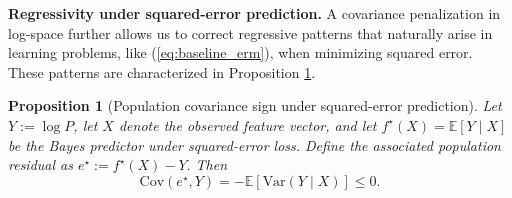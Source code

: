 \documentclass[12pt, draft]{article}
\theoremstyle{plain}
\newtheorem{proposition}{Proposition}
\theoremstyle{definition}
\newcommand{\E}{\mathbb{E}}
\newcommand{\1}{\mathbf{1}}
\newcommand{\Cov}{\text{Cov}}
\newcommand{\Var}{\text{Var}}
\begin{document}
{%


\medskip
\noindent\textbf{Regressivity under squared-error prediction.} A covariance penalization in log-space further allows us to correct regressive patterns that naturally arise in learning problems, like (\ref{eq:baseline_erm}), when minimizing squared error. These patterns are characterized in Proposition \ref{prop:population_covariance_identity}.

\begin{proposition}[Population covariance sign under squared-error prediction]
\label{prop:population_covariance_identity}
Let $Y:=\log P$, let $X$ denote the observed feature vector, and let
$
f^\star(X)=\E[Y\mid X]
$
be the Bayes predictor under squared-error loss. Define the associated population residual as
$
e^\star:=f^\star(X)-Y.
$
Then
\vspace{-2mm}
\begin{equation}
\label{eq:covariance_population_identity}
\Cov(e^\star,Y)
=
-\E\!\left[\Var(Y\mid X)\right]
\le 0.
\end{equation}
\end{proposition}

}
\end{document}
